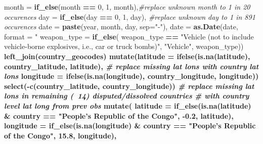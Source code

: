 \documentclass[11pt,oneside,a4paper]{reedthesis}
\newenvironment{Shaded}{\begin{snugshade}}{\end{snugshade}}
\newcommand{\KeywordTok}[1]{\textcolor[rgb]{0.13,0.29,0.53}{\textbf{#1}}}
\newcommand{\DataTypeTok}[1]{\textcolor[rgb]{0.13,0.29,0.53}{#1}}
\newcommand{\DecValTok}[1]{\textcolor[rgb]{0.00,0.00,0.81}{#1}}
\newcommand{\FloatTok}[1]{\textcolor[rgb]{0.00,0.00,0.81}{#1}}
\newcommand{\StringTok}[1]{\textcolor[rgb]{0.31,0.60,0.02}{#1}}
\newcommand{\CommentTok}[1]{\textcolor[rgb]{0.56,0.35,0.01}{\textit{#1}}}
\newcommand{\OperatorTok}[1]{\textcolor[rgb]{0.81,0.36,0.00}{\textbf{#1}}}
\newcommand{\NormalTok}[1]{#1}
\begin{document}
\begin{Shaded}
\begin{Highlighting}[]
{{{{{{{{{{         \DataTypeTok{month =} \KeywordTok{if_else}\NormalTok{(month }\OperatorTok{==}\StringTok{ }\DecValTok{0}\NormalTok{, }\DecValTok{1}\NormalTok{, month),}\CommentTok{#replace unknown month to 1 in 20 occurences }
         \DataTypeTok{day =} \KeywordTok{if_else}\NormalTok{(day }\OperatorTok{==}\StringTok{ }\DecValTok{0}\NormalTok{, }\DecValTok{1}\NormalTok{, day), }\CommentTok{#replace unknown day to 1 in 891 occurences}
         \DataTypeTok{date =} \KeywordTok{paste}\NormalTok{(year, month, day, }\DataTypeTok{sep=}\StringTok{"-"}\NormalTok{),}
         \DataTypeTok{date =} \KeywordTok{as.Date}\NormalTok{(date, }\DataTypeTok{format =} \StringTok{"%
         \DataTypeTok{weapon_type =} \KeywordTok{if_else}\NormalTok{(}
\NormalTok{           weapon_type }\OperatorTok{==}\StringTok{ "Vehicle (not to include vehicle-borne}
\StringTok{                           explosives, i.e., car or truck bombs)"}\NormalTok{, }
                          \StringTok{"Vehicle"}\NormalTok{, weapon_type)) }\OperatorTok{%
\StringTok{  }\KeywordTok{left_join}\NormalTok{(country_geocodes) }\OperatorTok{%
\StringTok{  }\KeywordTok{mutate}\NormalTok{(}\DataTypeTok{latitude =} \KeywordTok{ifelse}\NormalTok{(}\KeywordTok{is.na}\NormalTok{(latitude), country_latitude, }
\NormalTok{                           latitude), }\CommentTok{# replace missing lat lons with country lat lons}
         \DataTypeTok{longitude =} \KeywordTok{ifelse}\NormalTok{(}\KeywordTok{is.na}\NormalTok{(longitude), country_longitude, longitude)) }\OperatorTok{%
\StringTok{  }\KeywordTok{select}\NormalTok{(}\OperatorTok{-}\KeywordTok{c}\NormalTok{(country_latitude, country_longitude)) }\OperatorTok{%
\StringTok{  }\CommentTok{# replace missing lat lons in remaining (~14) disputed/dissolved countries }
\StringTok{  }\CommentTok{# with country level lat long from prev obs}
\StringTok{  }\KeywordTok{mutate}\NormalTok{(}
    \DataTypeTok{latitude =} \KeywordTok{if_else}\NormalTok{(}\KeywordTok{is.na}\NormalTok{(latitude) }\OperatorTok{&}\StringTok{ }\NormalTok{country }\OperatorTok{==}\StringTok{ }
\StringTok{                          "People's Republic of the Congo"}\NormalTok{, }\OperatorTok{-}\FloatTok{0.2}\NormalTok{, latitude),}
     \DataTypeTok{longitude =} \KeywordTok{if_else}\NormalTok{(}\KeywordTok{is.na}\NormalTok{(longitude) }\OperatorTok{&}\StringTok{ }\NormalTok{country }\OperatorTok{==}\StringTok{ }
\StringTok{                           "People's Republic of the Congo"}\NormalTok{, }\FloatTok{15.8}\NormalTok{, longitude),}
}}}}}}}}}}}}}}}
\end{Highlighting}
\end{Shaded}
\end{document}
